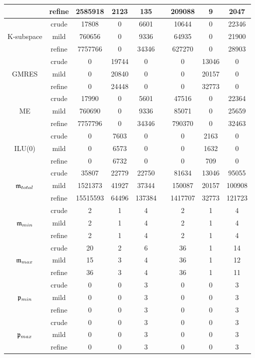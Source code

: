 \begin{table}[h]
\begin{adjustbox}{width=0.8\columnwidth,center}
\begin{tabular}{  ccccccccc }
		& refine & 2585918 & 2123 & 135  & & 209088 & 9 & 2047 \\
		\hline
		& crude & 17808 & 0 & 6601  & & 10644 & 0 & 22346 \\
		K-subspace  & mild & 760656 & 0 & 9336  & & 64935 & 0 & 21900 \\
		& refine & 7757766 & 0 & 34346  & &  627270 & 0 & 28903 \\
		\hline
		& crude & 0 & 19744 & 0  & & 0 & 13046 & 0 \\
		GMRES  & mild & 0 & 20840 & 0  & & 0 & 20157 & 0 \\
		& refine & 0 & 24448 & 0  & & 0 & 32773 & 0 \\
		\hline
		& crude & 17990 & 0 & 5601  & & 47516 & 0 & 22364 \\
		ME  & mild & 760690 & 0 & 9336  & & 85071 & 0 & 25659 \\
		& refine & 7757796 & 0 & 34346  & & 790370 & 0 & 32463 \\
		\hline
		& crude & 0 & 7603 & 0  & & 0 & 2163 & 0 \\
		ILU(0)  & mild & 0 & 6573 & 0  & & 0 & 1632 & 0 \\
		& refine & 0 & 6732 & 0 & &  0 & 709 & 0 \\
		\hline
		& crude & 35807 & 22779 & 22750  & & 81634 & 13046 & 95055 \\
		$\mathfrak{m}_{total}$  & mild & 1521373 & 41927 & 37344  & & 150087 & 20157 & 100908 \\
		& refine & 15515593 & 64496 & 137384 &  & 1417707 & 32773 & 121723 \\
		\hline
		& crude & 2 & 1 & 4  & & 2 & 1 & 4 \\
		$\mathfrak{m}_{min}$  & mild & 2 & 1 & 4 &  & 2 & 1 & 4  \\
		& refine & 2 & 1 & 4  & & 2 & 1 & 4 \\
		\hline
		& crude & 20 & 2 & 6  & & 36 & 1 & 14  \\
		$\mathfrak{m}_{max}$  & mild & 15 & 3 & 4  & & 36 & 1 & 12  \\
		& refine & 36 & 3 & 4  & & 36 & 1 & 11 \\
		\hline
		& crude & 0 & 0 & 3  & & 0 & 0 & 3 \\
		$\mathfrak{p}_{min}$  & mild & 0 & 0 & 3  & & 0 & 0 & 3 \\
		& refine & 0 & 0 & 3  & & 0 & 0 & 3 \\
		\hline
		& crude & 0 & 0 & 3  & & 0 & 0 & 3 \\
		$\mathfrak{p}_{max}$  & mild & 0 & 0 & 3  & & 0 & 0 & 3 \\
		& refine & 0 & 0 & 3  & & 0 & 0 & 3 \\
		\hline
	\end{tabular}
\end{adjustbox}
	\label{tab:num-exp-lldp-var-step:brussdnd}
\end{table}

